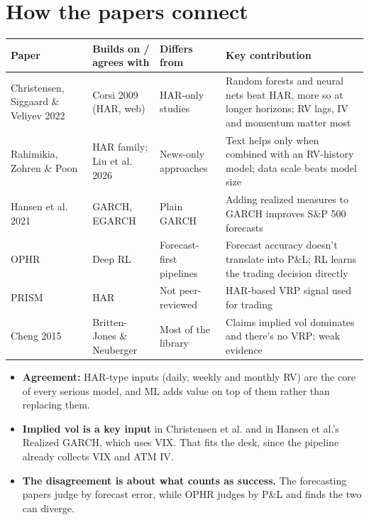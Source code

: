 \documentclass{article}
\begin{document}
\section{How the papers connect}

\begin{center}\small
\begin{tabularx}{\linewidth}{>{\raggedright\arraybackslash}X >{\raggedright\arraybackslash}X >{\raggedright\arraybackslash}X >{\raggedright\arraybackslash}X}
\toprule
\textbf{Paper} & \textbf{Builds on /\allowbreak{} agrees with} & \textbf{Differs from} & \textbf{Key contribution} \\
\midrule
Christensen, Siggaard \& Veliyev 2022 & Corsi 2009 (HAR, web) & HAR-only studies & Random forests and neural nets beat HAR, more so at longer horizons; RV lags, IV and momentum matter most \\
Rahimikia, Zohren \& Poon & HAR family; Liu et al. 2026 & News-only approaches & Text helps only when combined with an RV-history model; data scale beats model size \\
Hansen et al. 2021 & GARCH, EGARCH & Plain GARCH & Adding realized measures to GARCH improves S\&P 500 forecasts \\
OPHR & Deep RL & Forecast-first pipelines & Forecast accuracy doesn't translate into P\&L; RL learns the trading decision directly \\
PRISM & HAR & Not peer-reviewed & HAR-based VRP signal used for trading \\
Cheng 2015 & Britten-Jones \& Neuberger & Most of the library & Claims implied vol dominates and there's no VRP; weak evidence \\
\bottomrule
\end{tabularx}
\end{center}

\begin{itemize}

\item \textbf{Agreement:} HAR-type inputs (daily, weekly and monthly RV) are the core of every serious model, and ML adds value on top of them rather than replacing them.

\item \textbf{Implied vol is a key input} in Christensen et al. and in Hansen et al.'s Realized GARCH, which uses VIX. That fits the desk, since the pipeline already collects VIX and ATM IV.

\item \textbf{The disagreement is about what counts as success.} The forecasting papers judge by forecast error, while OPHR judges by P\&L and finds the two can diverge.

\end{itemize}
\end{document}
